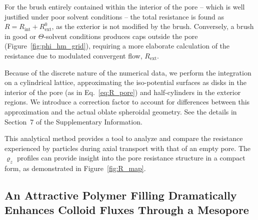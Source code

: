 \documentclass[12pt, a4paper]{article}
\begin{document}
For the brush entirely contained within the interior of the pore -- which is well justified under poor solvent conditions -- the total resistance is found as $R = R_{\text{int}} + R_{\text{ext}}^{0}$, as the exterior is not modified by the brush.
Conversely, a brush in good or $\Theta$-solvent conditions produces caps outside the pore (Figure~\ref{fig:phi_hm_grid}), requiring a more elaborate calculation of the resistance due to modulated convergent flow, $R_{\text{ext}}$.

Because of the discrete nature of the numerical data, we perform the integration on a cylindrical lattice, approximating the iso-potential surfaces as disks in the interior of the pore (as in Eq.~\ref{eq:R_pore}) and half-cylinders in the exterior regions.
We introduce a correction factor to account for differences between this approximation and the actual oblate spheroidal geometry.
See the details in Section~7 of the Supplementary Information.

This analytical method provides a tool to analyze and compare the resistance experienced by particles during axial transport with that of an empty pore.
The $\varrho_{z}$ profiles can provide insight into the pore resistance structure in a compact form, as demonstrated in Figure~\ref{fig:R_map}.


\subsection{An Attractive Polymer Filling Dramatically Enhances Colloid Fluxes Through a Mesopore}
\end{document}
